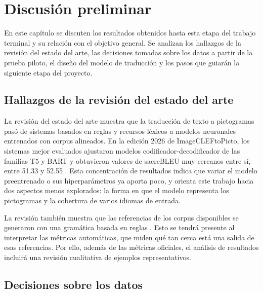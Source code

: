 \section{Discusión preliminar}
\label{sec:discusion}

En este capítulo se discuten los resultados obtenidos hasta esta etapa del trabajo terminal y su relación con el objetivo general. Se analizan los hallazgos de la revisión del estado del arte, las decisiones tomadas sobre los datos a partir de la prueba piloto, el diseño del modelo de traducción y los pasos que guiarán la siguiente etapa del proyecto.

\subsection{Hallazgos de la revisión del estado del arte}

La revisión del estado del arte muestra que la traducción de texto a pictogramas pasó de sistemas basados en reglas y recursos léxicos a modelos neuronales entrenados con corpus alineados. En la edición 2026 de ImageCLEFtoPicto, los sistemas mejor evaluados ajustaron modelos codificador-decodificador de las familias T5 y BART y obtuvieron valores de sacreBLEU muy cercanos entre sí, entre 51.33 y 52.55 \cite{Hjuler2026}. Esta concentración de resultados indica que variar el modelo preentrenado o sus hiperparámetros ya aporta poco, y orienta este trabajo hacia dos aspectos menos explorados: la forma en que el modelo representa los pictogramas y la cobertura de varios idiomas de entrada.

La revisión también muestra que las referencias de los corpus disponibles se generaron con una gramática basada en reglas \cite{macaire2024}. Esto se tendrá presente al interpretar las métricas automáticas, que miden qué tan cerca está una salida de esas referencias. Por ello, además de las métricas oficiales, el análisis de resultados incluirá una revisión cualitativa de ejemplos representativos.

\subsection{Decisiones sobre los datos}

